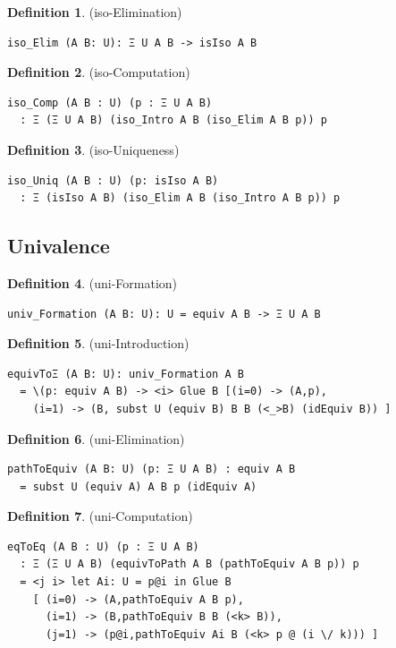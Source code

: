 \documentclass{article}
\theoremstyle{definition}
\newtheorem{definition}{Definition}
\begin{document}
\begin{definition} (iso-Elimination)
\begin{lstlisting}
iso_Elim (A B: U): Ξ U A B -> isIso A B
\end{lstlisting}
\end{definition}

\begin{definition} (iso-Computation)
\begin{lstlisting}
iso_Comp (A B : U) (p : Ξ U A B)
  : Ξ (Ξ U A B) (iso_Intro A B (iso_Elim A B p)) p
\end{lstlisting}
\end{definition}

\begin{definition} (iso-Uniqueness)
\begin{lstlisting}
iso_Uniq (A B : U) (p: isIso A B)
  : Ξ (isIso A B) (iso_Elim A B (iso_Intro A B p)) p
\end{lstlisting}
\end{definition}

\newpage
\subsection{Univalence}

\begin{definition} (uni-Formation)
\begin{lstlisting}
univ_Formation (A B: U): U = equiv A B -> Ξ U A B
\end{lstlisting}
\end{definition}

\begin{definition} (uni-Introduction)
\begin{lstlisting}
equivToΞ (A B: U): univ_Formation A B
  = \(p: equiv A B) -> <i> Glue B [(i=0) -> (A,p),
    (i=1) -> (B, subst U (equiv B) B B (<_>B) (idEquiv B)) ]
\end{lstlisting}
\end{definition}

\begin{definition} (uni-Elimination)
\begin{lstlisting}
pathToEquiv (A B: U) (p: Ξ U A B) : equiv A B
  = subst U (equiv A) A B p (idEquiv A)
\end{lstlisting}
\end{definition}

\begin{definition} (uni-Computation)
\begin{lstlisting}
eqToEq (A B : U) (p : Ξ U A B)
  : Ξ (Ξ U A B) (equivToPath A B (pathToEquiv A B p)) p
  = <j i> let Ai: U = p@i in Glue B
    [ (i=0) -> (A,pathToEquiv A B p),
      (i=1) -> (B,pathToEquiv B B (<k> B)),
      (j=1) -> (p@i,pathToEquiv Ai B (<k> p @ (i \/ k))) ]

\end{lstlisting}
\end{definition}
\end{document}

